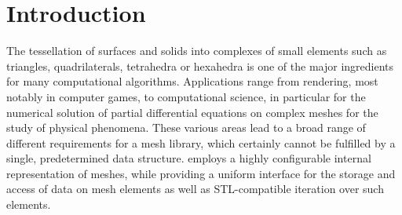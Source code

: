 
\chapter*{Introduction}    \label{intro}

The tessellation of surfaces and solids into complexes of small elements such as triangles, quadrilaterals, tetrahedra or hexahedra is one of the major ingredients for many computational algorithms.
Applications range from rendering, most notably in computer games, to computational science, in particular for the numerical solution of partial differential equations on complex meshes for the study of physical phenomena.
These various areas lead to a broad range of different requirements for a mesh library, which certainly cannot be fulfilled by a single, predetermined data structure.
{\ViennaGrid} employs a highly configurable internal representation of meshes, while providing a uniform interface for the storage and access of data on mesh elements as well as STL-compatible iteration over such elements.

